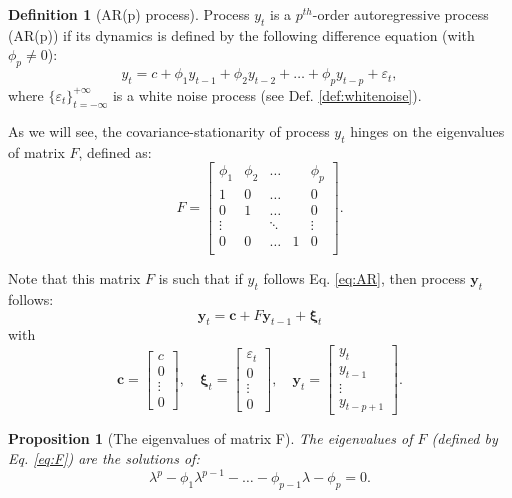 \documentclass[
  12pt,
]{book}
\newtheorem{proposition}{Proposition}[chapter]
\theoremstyle{definition}
\newtheorem{definition}{Definition}[chapter]
\theoremstyle{definition}
\theoremstyle{definition}
\theoremstyle{definition}
\theoremstyle{remark}
\begin{document}
\begin{definition}[AR(p) process]
\protect\hypertarget{def:ARp}{}\label{def:ARp}Process \(y_t\) is a \(p^{th}\)-order autoregressive process (AR(p)) if its dynamics is defined by the following difference equation (with \(\phi_p \ne 0\)):
\begin{equation}
y_t = c + \phi_1 y_{t-1} + \phi_2 y_{t-2} + \dots + \phi_p y_{t-p} + \varepsilon_t,\label{eq:AR}
\end{equation}
where \(\{\varepsilon_t\}_{t = -\infty}^{+\infty}\) is a white noise process (see Def. \ref{def:whitenoise}).
\end{definition}

As we will see, the covariance-stationarity of process \(y_t\) hinges on the eigenvalues of matrix \(F\), defined as:
\begin{equation}
F = \left[
\begin{array}{ccccc}
\phi_1 & \phi_2 & \dots& & \phi_p \\
1 & 0 &\dots && 0 \\
0 & 1 &\dots && 0 \\
\vdots &  & \ddots && \vdots \\
0 & 0 &\dots &1& 0 \\
\end{array}
\right].\label{eq:F}
\end{equation}

Note that this matrix \(F\) is such that if \(y_t\) follows Eq. \eqref{eq:AR}, then process \(\mathbf{y}_t\) follows:
\[
\mathbf{y}_t = \mathbf{c} + F \mathbf{y}_{t-1} + \boldsymbol\xi_t
\]
with
\[
\mathbf{c} =
\left[\begin{array}{c}
c\\
0\\
\vdots\\
0
\end{array}\right],
\quad
\boldsymbol\xi_t =
\left[\begin{array}{c}
\varepsilon_t\\
0\\
\vdots\\
0
\end{array}\right],
\quad
\mathbf{y}_t =
\left[\begin{array}{c}
y_t\\
y_{t-1}\\
\vdots\\
y_{t-p+1}
\end{array}\right].
\]

\begin{proposition}[The eigenvalues of matrix F]
\protect\hypertarget{prp:Feigen}{}\label{prp:Feigen}The eigenvalues of \(F\) (defined by Eq. \eqref{eq:F}) are the solutions of:
\begin{equation}
\lambda^p - \phi_1 \lambda^{p-1} - \dots - \phi_{p-1}\lambda - \phi_p = 0.\label{eq:Feigen}
\end{equation}
\end{proposition}
\end{document}
